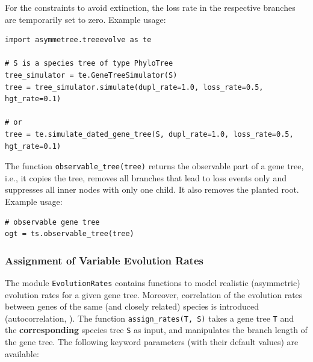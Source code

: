 \documentclass[hidelinks,11pt]{article}
\begin{document}
\noindent
For the constraints to avoid extinction, the loss rate in the respective branches are temporarily set to zero.
Example usage:

\begin{adjustwidth}{1cm}{1cm}\vspace{2mm}
\begin{verbatim}
import asymmetree.treeevolve as te

# S is a species tree of type PhyloTree
tree_simulator = te.GeneTreeSimulator(S)
tree = tree_simulator.simulate(dupl_rate=1.0, loss_rate=0.5, hgt_rate=0.1)

# or
tree = te.simulate_dated_gene_tree(S, dupl_rate=1.0, loss_rate=0.5, hgt_rate=0.1)
\end{verbatim}
\end{adjustwidth}

The function \texttt{observable\_tree(tree)} returns the observable part of a gene tree, i.e., it copies the tree, removes all branches that lead to loss events only and suppresses all inner nodes with only one child.
It also removes the planted root.
Example usage:
\begin{adjustwidth}{1cm}{1cm}\vspace{2mm}
\begin{verbatim}
# observable gene tree
ogt = ts.observable_tree(tree)
\end{verbatim}
\end{adjustwidth}


\subsubsection{Assignment of Variable Evolution Rates}
\label{sec:evolution_rates}

The module \texttt{EvolutionRates} contains functions to model realistic (asymmetric) evolution rates for a given gene tree.
Moreover, correlation of the evolution rates between genes of the same (and closely related) species is introduced (autocorrelation, \citep{kishino2001}).
The function \texttt{assign\_rates(T, S)} takes a gene tree \texttt{T} and the \textbf{corresponding} species tree \texttt{S} as input, and manipulates the branch length of the gene tree.
The following keyword parameters (with their default values) are available:
\end{document}
